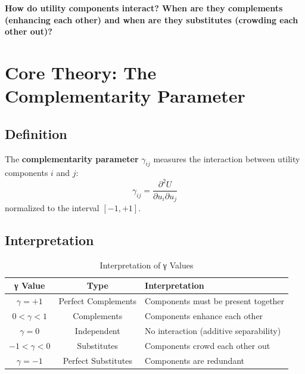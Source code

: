 \begin{tcolorbox}[colback=red!5!white, colframe=red!75!black,
    title=The Fundamental Question]
\textbf{How do utility components interact? When are they complements (enhancing each other) and when are they substitutes (crowding each other out)?}
\end{tcolorbox}


\section{Core Theory: The Complementarity Parameter}
\label{sec:how-gamma}

\subsection{Definition}

\begin{definition}
The \textbf{complementarity parameter} $\gamma_{ij}$ measures the interaction
between utility components $i$ and $j$:
\begin{equation}
\gamma_{ij} = \frac{\partial^2 U}{\partial u_i \partial u_j}
\end{equation}
normalized to the interval $[-1, +1]$.
\end{definition}

\subsection{Interpretation}

\begin{table}[htbp]
\centering
\caption{Interpretation of γ Values}
\label{tab:how-gamma-types}
\renewcommand{\arraystretch}{1.3}
\begin{tabular}{@{}ccl@{}}
\toprule
\textbf{γ Value} & \textbf{Type} & \textbf{Interpretation} \\
\midrule
$\gamma = +1$ & Perfect Complements & Components must be present together \\
$0 < \gamma < 1$ & Complements & Components enhance each other \\
$\gamma = 0$ & Independent & No interaction (additive separability) \\
$-1 < \gamma < 0$ & Substitutes & Components crowd each other out \\
$\gamma = -1$ & Perfect Substitutes & Components are redundant \\
\bottomrule
\end{tabular}
\end{table}

